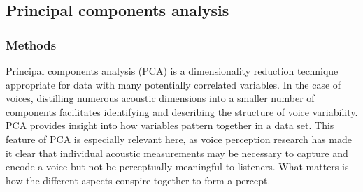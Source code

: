 




\subsection{Principal components analysis}\label{ch3:sec:pca}
\subsubsection{Methods}
Principal components analysis (PCA) is a dimensionality reduction technique appropriate for data with many potentially correlated variables. In the case of voices, distilling numerous acoustic dimensions into a smaller number of components facilitates identifying and describing the structure of voice variability. PCA provides insight into how variables pattern together in a data set. This feature of PCA is especially relevant here, as voice perception research has made it clear that individual acoustic measurements may be necessary to capture and encode a voice but not be perceptually meaningful to listeners. What matters is how the different aspects conspire together to form a percept. 

